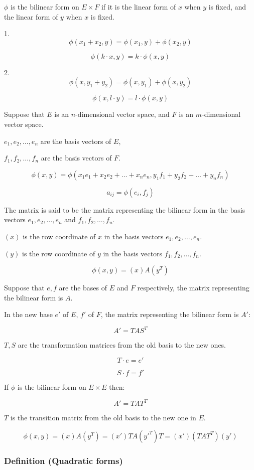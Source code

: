 $\phi$ is the bilinear form on $E \times F$ if it is the linear form of $x$ when $y$ is fixed, and the linear form of $y$ when $x$ is fixed.

1. \[
\phi(x_1 + x_2, y) = \phi(x_1, y) + \phi(x_2, y)
\]

\[
\phi(k \cdot x, y) = k \cdot \phi(x, y)
\]

2. \[
\phi(x, y_1 + y_2) = \phi(x, y_1) + \phi(x, y_2)
\]

\[
\phi(x, l \cdot y) = l \cdot \phi(x, y)
\]

Suppose that $E$ is an $n$-dimensional vector space, and $F$ is an $m$-dimensional vector space.

$e_1, e_2, \ldots, e_n$ are the basis vectors of $E$,

$f_1, f_2, \ldots, f_n$ are the basis vectors of $F$.

\[
\phi(x, y) = \phi(x_1 e_1 + x_2 e_2 + \ldots + x_n e_n, y_1 f_1 + y_2 f_2 + \ldots + y_n f_n)
\]

\[
a_{ij} = \phi(e_i, f_j)
\]

The matrix is said to be the matrix representing the bilinear form in the basis vectors $e_1, e_2, \ldots, e_n$ and $f_1, f_2, \ldots, f_n$.

$(x)$ is the row coordinate of $x$ in the basis vectors $e_1, e_2, \ldots, e_n$.

$(y)$ is the row coordinate of $y$ in the basis vectors $f_1, f_2, \ldots, f_n$.

\[
\phi(x, y) = (x) A (y^T)
\]

Suppose that $e, f$ are the bases of $E$ and $F$ respectively, the matrix representing the bilinear form is $A$.

In the new base $e'$ of $E$, $f'$ of $F$, the matrix representing the bilinear form is $A'$:

\[
A' = T A S^T
\]

$T, S$ are the transformation matrices from the old basis to the new ones.

\[
T \cdot e = e'
\]

\[
S \cdot f = f'
\]

If $\phi$ is the bilinear form on $E \times E$ then:

\[
A' = T A T^T
\]

$T$ is the transition matrix from the old basis to the new one in $E$.

\[
\phi(x, y) = (x) A (y^T) = (x') T A (y'^T) T = (x') (T A T^T) (y')
\]


\subsubsection{Definition (Quadratic forms)}

